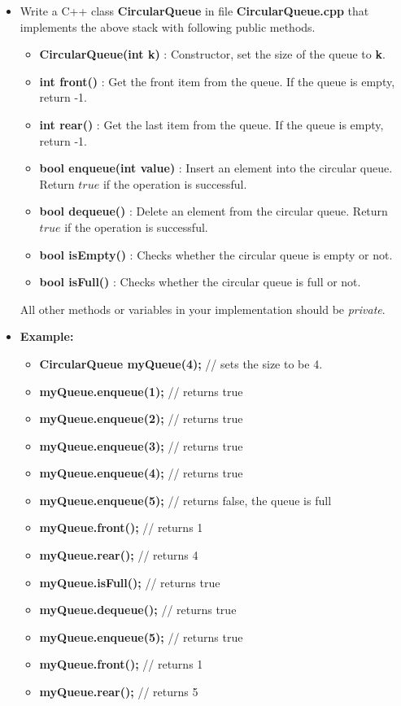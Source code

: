 \documentclass[14pt]{article}
\begin{document}
\begin{itemize}
    \item Write a C++ class \textbf{CircularQueue} in file \textbf{CircularQueue.cpp} that implements the above stack with following public methods.
    \begin{itemize}
        \item \textbf{CircularQueue(int k)} : Constructor, set the size of the queue to \textbf{k}.
        \item \textbf{int front()} : Get the front item from the queue. If the queue is empty, return -1.
        \item \textbf{int rear()} : Get the last item from the queue. If the queue is empty, return -1.
        \item \textbf{bool enqueue(int value)} : Insert an element into the circular queue. Return $true$ if the operation is successful.
        \item \textbf{bool dequeue()} : Delete an element from the circular queue. Return $true$ if the operation is successful.
        \item \textbf{bool isEmpty()} : Checks whether the circular queue is empty or not.
        \item \textbf{bool isFull()} : Checks whether the circular queue is full or not.
    \end{itemize}
    All other methods or variables in your implementation should be \textit{private}.
    \item \textbf{Example:}
        \begin{itemize}
        \item \textbf{CircularQueue myQueue(4);} // sets the size to be 4.
        \item \textbf{myQueue.enqueue(1);} // returns true
        \item \textbf{myQueue.enqueue(2);} // returns true
        \item \textbf{myQueue.enqueue(3);} // returns true
        \item \textbf{myQueue.enqueue(4);} // returns true
        \item \textbf{myQueue.enqueue(5);} // returns false, the queue is full
        \item \textbf{myQueue.front();} // returns 1
        \item \textbf{myQueue.rear();} // returns 4
        \item \textbf{myQueue.isFull();} // returns true
        \item \textbf{myQueue.dequeue();} // returns true
        \item \textbf{myQueue.enqueue(5);} // returns true
        \item \textbf{myQueue.front();} // returns 1
        \item \textbf{myQueue.rear();} // returns 5
        \end{itemize}
\end{itemize}
\end{document}
